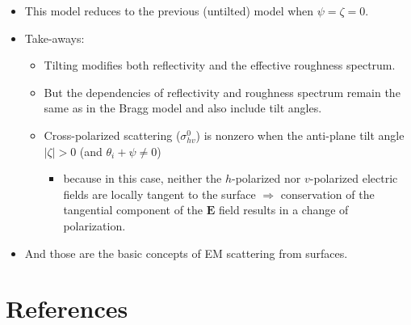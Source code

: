 \documentclass[11pt, oneside]{article}
\begin{document}
\begin{itemize}
	\item This model reduces to the previous (untilted) model when $\psi = \zeta = 0$.
	\item Take-aways:
	\begin{itemize}
		\item Tilting modifies both reflectivity and the effective roughness spectrum.
		\item But the dependencies of reflectivity and roughness spectrum remain the same as in the Bragg model and also include tilt angles.
		\item Cross-polarized scattering ($\sigma_{hv}^0$) is nonzero when the anti-plane tilt angle $|\zeta| > 0$ (and ${\theta_i + \psi \ne 0}$)
		\begin{itemize}
			\item[$\rightarrow$] because in this case, neither the $h$-polarized nor $v$-polarized electric fields are locally tangent to the surface $\Rightarrow$ conservation of the tangential component of the $\mathbf{E}$ field results in a change of polarization.
		\end{itemize}
	\end{itemize}
	\item And those are the basic concepts of EM scattering from surfaces.
\end{itemize}

\section*{References}
\end{document}
